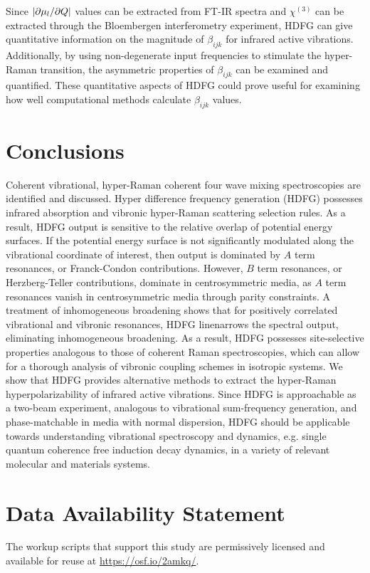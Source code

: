 \documentclass[aip, jcp, reprint, onecolumn, nofootinbib]{revtex4-2}
\begin{document}
Since $\abs{\partial \mu_l / \partial Q}$ values can be extracted from FT-IR spectra and $\chi^{(3)}$ can be extracted through the Bloembergen interferometry experiment,\cite{Levenson1974_1, Levenson1974_2, RN459} HDFG can give quantitative information on the magnitude of $\beta_{ijk}$ for infrared active vibrations.
Additionally, by using non-degenerate input frequencies to stimulate the hyper-Raman transition, the asymmetric properties of $\beta_{ijk}$ can be examined and quantified. \cite{Denisov1986, Kozich2007}
These quantitative aspects of HDFG could prove useful for examining how well computational methods calculate $\beta_{ijk}$ values.

\section{Conclusions}\label{conclusion}
Coherent vibrational, hyper-Raman coherent four wave mixing spectroscopies are identified and discussed.
Hyper difference frequency generation (HDFG) possesses infrared absorption and vibronic hyper-Raman scattering selection rules.
As a result, HDFG output is sensitive to the relative overlap of potential energy surfaces.
If the potential energy surface is not significantly modulated along the vibrational coordinate of interest, then output is dominated by $A$ term resonances, or Franck-Condon contributions.
However, $B$ term resonances, or Herzberg-Teller contributions, dominate in centrosymmetric media, as $A$ term resonances vanish in centrosymmetric media through parity constraints.
A treatment of inhomogeneous broadening shows that for positively correlated vibrational and vibronic resonances, HDFG linenarrows the spectral output, eliminating inhomogeneous broadening. 
As a result, HDFG possesses site-selective properties analogous to those of coherent Raman spectroscopies, which can allow for a thorough analysis of vibronic coupling schemes in isotropic systems.
We show that HDFG provides alternative methods to extract the hyper-Raman hyperpolarizability of infrared active vibrations. 
Since HDFG is approachable as a two-beam experiment, analogous to vibrational sum-frequency generation, and phase-matchable in media with normal dispersion, HDFG should be applicable towards understanding vibrational spectroscopy and dynamics, e.g. single quantum coherence free induction decay dynamics, in a variety of relevant molecular and materials systems.  

\section{Data Availability Statement}
The workup scripts that support this study are permissively licensed and available for reuse at \href{https://osf.io/2amkq/}{https://osf.io/2amkq/}.
\end{document}
